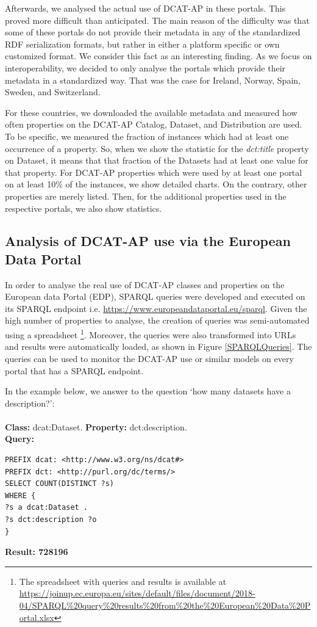 \documentclass[<options>]{elsarticle}
\begin{document}
Afterwards, we analysed the actual use of DCAT-AP in these portals. This proved more difficult than anticipated. The main reason of the difficulty was that some of these portals do not provide their metadata in any of the standardized RDF serialization formats, but rather in either a platform specific or own customized format. We consider this fact as an interesting finding. As we focus on interoperability, we decided to only analyse the portals which provide their metadata in a standardized way. That was the case for Ireland, Norway, Spain, Sweden, and Switzerland.

For these countries, we downloaded the available metadata and measured how often properties on the DCAT-AP Catalog, Dataset, and Distribution are used. To be specific, we measured the fraction of instances which had at least one occurrence of a property. So, when we show the statistic for the \textit{dct:title} property on Dataset, it means that that fraction of the Datasets had at least one value for that property. For DCAT-AP properties which were used by at least one portal on at least 10\% of the instances, we show detailed charts. On the contrary, other properties are merely listed. Then, for the additional properties used in the respective portals, we also show statistics.

\subsection{Analysis of DCAT-AP use via the European Data Portal}

In order to analyse the real use of DCAT-AP classes and properties on the European data Portal (EDP), SPARQL queries were developed and executed on its SPARQL endpoint i.e. \url{https://www.europeandataportal.eu/sparql}. Given the high number of properties to analyse, the creation of queries was semi-automated using a spreadsheet \footnote{The spreadsheet with queries and results is available at  \url{https://joinup.ec.europa.eu/sites/default/files/document/2018-04/SPARQL\%20query\%20results\%20from\%20the\%20European\%20Data\%20Portal.xlsx}}. Moreover, the queries were also transformed into URLs and results were automatically loaded, as shown in Figure \ref{SPARQLQueries}. The queries can be used to monitor the DCAT-AP use or similar models on every portal that has a SPARQL endpoint.

In the example below, we answer to the question ‘how many datasets have a description?’:
\\
\\
\textbf{Class:} dcat:Dataset. \textbf{Property:} dct:description. \\
\textbf{Query:}
\begin{lstlisting}
PREFIX dcat: <http://www.w3.org/ns/dcat#>
PREFIX dct: <http://purl.org/dc/terms/>
SELECT COUNT(DISTINCT ?s)
WHERE {
?s a dcat:Dataset .
?s dct:description ?o
}
\end{lstlisting}
\textbf{Result: 728196}
\end{document}
